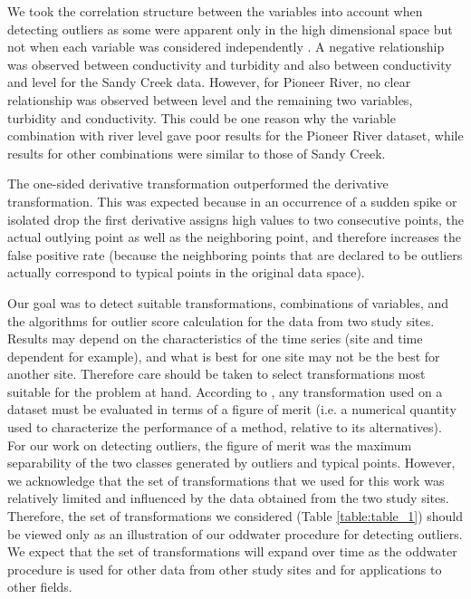 \documentclass[draft]{agujournal2018} %
\begin{document}
We took the correlation structure between the variables into account when detecting outliers as some were apparent only in the high dimensional space but not when each variable was considered independently
\citep{ben2005outlier}. A negative relationship was observed between
conductivity and turbidity and also between conductivity and level for
the Sandy Creek data. However, for Pioneer River, no clear relationship
was observed between level and the remaining two variables, turbidity
and conductivity. This could be one reason why the variable combination
with river level gave poor results for the Pioneer River dataset, while
results for other combinations were similar to those of Sandy Creek.

The one-sided derivative transformation outperformed the derivative
transformation. This was expected because in an occurrence of a sudden
spike or isolated drop the first derivative assigns high values to two
consecutive points, the actual outlying point as well as the neighboring
point, and therefore increases the false positive rate (because the
neighboring points that are declared to be outliers actually correspond
to typical points in the original data space).

Our goal was to detect
suitable transformations, combinations of variables, and the algorithms
for outlier score calculation for the data from two study sites. Results may depend on the characteristics of the time series (site and time
dependent for example), and what is best for one site may not be the
best for another site. Therefore care should be taken to select
transformations most suitable for the problem at hand. According to
\citet{dang2014transforming}, any transformation used on a dataset
must be evaluated in terms of a figure of merit \color{black} (i.e. a numerical quantity used to characterize the performance of a method, relative to its alternatives). \color{black}  For our work on
detecting outliers, the figure of merit was the maximum separability of
the two classes generated by outliers and typical points. However, we
acknowledge that the set of transformations that we used for this work
was relatively limited and influenced by the data obtained from the two
study sites. Therefore, the set of transformations we considered (Table
\ref{table:table_1}) should be viewed only as an illustration of our
\color{black} oddwater procedure \color{black} for detecting outliers. We expect that the set of
transformations will expand over time as the \color{black} oddwater procedure \color{black} is used for other
data from other study sites and for applications to other fields.
\end{document}
